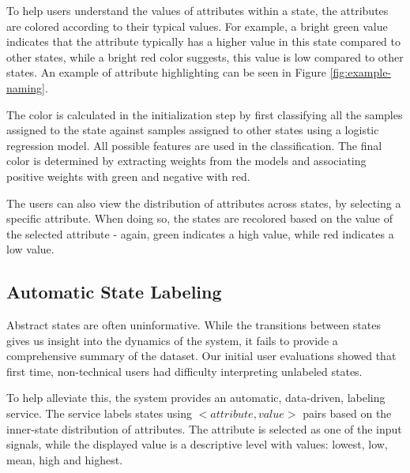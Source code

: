%
To help users understand the  values of attributes within a state, the attributes are colored according to their typical values.  For example, a bright green
value indicates that the attribute typically  has a higher value in this state compared to other states, while
a bright red color suggests, this value is low compared to other states. An example of attribute 
highlighting can be seen in Figure \ref{fig:example-naming}.

The color is calculated in the initialization step by first classifying all the samples assigned to the state 
against samples assigned to other states using a logistic regression model. All possible features are  used in the 
classification. %
The final color is determined by extracting weights from the models and associating positive weights
with green and negative with red.

The users can also view the distribution of attributes across states, by selecting a specific attribute.
When doing so, the states are recolored based on the value of the selected attribute - again, green indicates
a high value, while red indicates a low value.


\subsection{Automatic State Labeling}

Abstract states are often uninformative. While the transitions between states gives us insight into the dynamics of the system, it fails to provide a comprehensive summary 
of the dataset. Our initial user evaluations showed that first time, non-technical users had difficulty interpreting unlabeled states. %

To help alleviate this, the system provides an automatic, data-driven, labeling service. The service labels states using ${<attribute,value>}$ pairs based on the inner-state distribution of attributes. The attribute is selected as one of the input signals, while the displayed value is a descriptive level with values: lowest, low, mean, high and highest.

